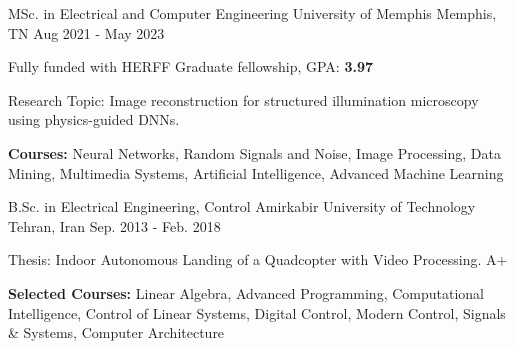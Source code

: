 

\begin{cventries}

  \cventry
    {MSc. in Electrical and Computer Engineering} %
    {University of Memphis} %
    {Memphis, TN} %
    {Aug 2021 - May 2023} %
    {
      \begin{cvitems} %
        \item {Fully funded with HERFF Graduate fellowship, GPA:\textbf{ 3.97}}
        \item {Research Topic: Image reconstruction for structured illumination microscopy using physics-guided DNNs.}
        \item {\textbf{Courses:} Neural Networks, Random Signals and Noise, Image Processing, Data Mining, Multimedia Systems, Artificial Intelligence, Advanced Machine Learning}
      \end{cvitems}
    }
    
  \cventry
    {B.Sc. in Electrical Engineering, Control} %
    {Amirkabir University of Technology} %
    {Tehran, Iran} %
    {Sep. 2013 - Feb. 2018} %
    {
      \begin{cvitems} %
        \item {Thesis: Indoor Autonomous Landing of a Quadcopter with Video Processing. A+} 
        \item {\textbf{Selected Courses:} Linear Algebra, Advanced Programming, Computational Intelligence, Control of Linear Systems, Digital Control, Modern Control, Signals \& Systems, Computer Architecture}
      \end{cvitems}
        }
    
\end{cventries}
